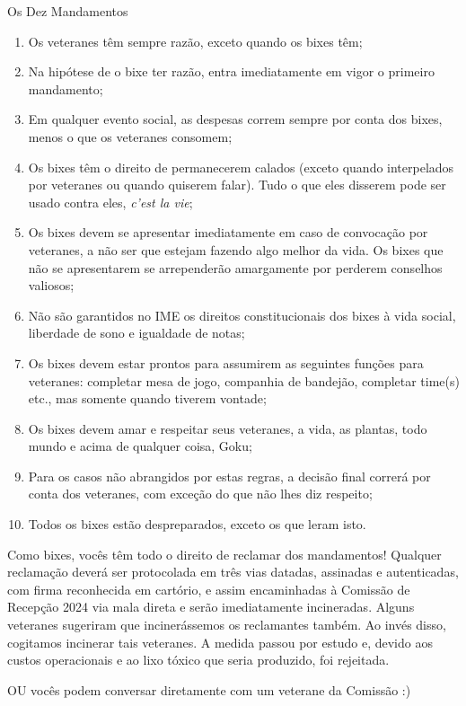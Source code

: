 \begin{editorial}{Os Dez Mandamentos}

\begin{enumerate}
  \item Os veteranes têm sempre razão, exceto quando os bixes têm;
  \item Na hipótese de o bixe ter razão, entra imediatamente em vigor
        o primeiro mandamento;
  \item Em qualquer evento social, as despesas correm sempre por conta dos
        bixes, menos o que os veteranes consomem;
  \item Os bixes têm o direito de permanecerem calados (exceto quando
        interpelados por veteranes ou quando quiserem falar). Tudo o que eles
        disserem pode ser usado contra eles, \textit{c’est la vie};
  \item Os bixes devem se apresentar imediatamente em caso de convocação por
        veteranes, a não ser que estejam fazendo algo melhor da vida. Os bixes
        que não se apresentarem se arrependerão amargamente por perderem
        conselhos valiosos; %
  \item Não são garantidos no IME os direitos constitucionais dos bixes à vida
        social, liberdade de sono e igualdade de notas;
  \item Os bixes devem estar prontos para assumirem as seguintes funções para
        veteranes: completar mesa de jogo, companhia de bandejão, completar
        time(s) etc., mas somente quando tiverem vontade;
  \item Os bixes devem amar e respeitar seus veteranes, a vida, as plantas,
        todo mundo e acima de qualquer coisa, Goku;
  \item Para os casos não abrangidos por estas regras, a decisão final correrá
        por conta dos veteranes, com exceção do que não lhes diz respeito;
  \item Todos os bixes estão despreparados, exceto os que leram isto.
\end{enumerate}

Como bixes, vocês têm todo o direito de reclamar dos mandamentos! 
Qualquer reclamação deverá ser protocolada em três vias datadas, assinadas e
autenticadas, com firma reconhecida em cartório, e assim encaminhadas à
Comissão de Recepção 2024 %
via mala direta e serão imediatamente incineradas. Alguns veteranes sugeriram
que incinerássemos os reclamantes também. Ao invés disso, cogitamos incinerar
tais veteranes. A medida passou por estudo e, devido aos custos operacionais e
ao lixo tóxico que seria produzido, foi rejeitada.

OU vocês podem conversar diretamente com um veterane da Comissão :)

\end{editorial}
